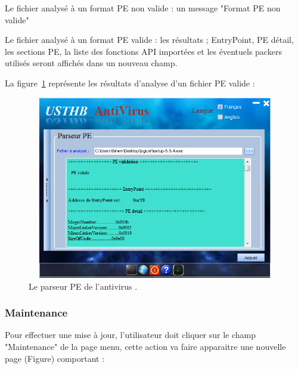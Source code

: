 \begin{list}{•}{}
\item Le fichier analysé à un format PE non valide : un message "Format PE non valide"
\item Le fichier analysé à un format PE valide : les résultats ; EntryPoint, PE détail, les sections PE,  la liste des fonctions API importées et les éventuels packers utilisés 
seront affichés dans un nouveau champ.\\
\end{list}
La figure~\ref{fig :ant7} représente les résultats d'analyse d'un fichier PE valide :
\begin{figure}[H]
\begin{center}
\includegraphics[width=13cm, height=8cm]{Figures/ant7.png}
\caption{Le parseur PE de l'antivirus .}
\label{fig :ant7} 
\end{center}
\end{figure}

\subsubsection{Maintenance}
Pour effectuer une mise à jour, l'utilisateur doit cliquer sur le champ "Maintenance" de la page menu, cette action va faire apparaitre une nouvelle page (Figure) comportant :\\

